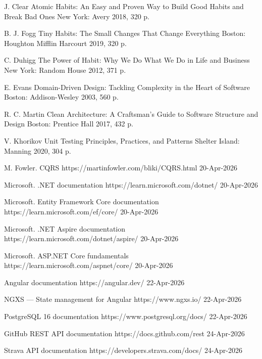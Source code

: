 

\bibitemieee
{J. Clear}
{Atomic Habits: An Easy and Proven Way to Build Good Habits and Break Bad Ones}
{New York: Avery}
{2018, 320 p.}

\bibitemieee
{B. J. Fogg}
{Tiny Habits: The Small Changes That Change Everything}
{Boston: Houghton Mifflin Harcourt}
{2019, 320 p.}

\bibitemieee
{C. Duhigg}
{The Power of Habit: Why We Do What We Do in Life and Business}
{New York: Random House}
{2012, 371 p.}

\bibitemieee
{E. Evans}
{Domain-Driven Design: Tackling Complexity in the Heart of Software}
{Boston: Addison-Wesley}
{2003, 560 p.}

\bibitemieee
{R. C. Martin}
{Clean Architecture: A Craftsman's Guide to Software Structure and Design}
{Boston: Prentice Hall}
{2017, 432 p.}

\bibitemieee
{V. Khorikov}
{Unit Testing Principles, Practices, and Patterns}
{Shelter Island: Manning}
{2020, 304 p.}

\bibitemweb
{M. Fowler. CQRS}
{https://martinfowler.com/bliki/CQRS.html}
{20-Apr-2026}

\bibitemweb
{Microsoft. .NET documentation}
{https://learn.microsoft.com/dotnet/}
{20-Apr-2026}

\bibitemweb
{Microsoft. Entity Framework Core documentation}
{https://learn.microsoft.com/ef/core/}
{20-Apr-2026}

\bibitemweb
{Microsoft. .NET Aspire documentation}
{https://learn.microsoft.com/dotnet/aspire/}
{20-Apr-2026}

\bibitemweb
{Microsoft. ASP.NET Core fundamentals}
{https://learn.microsoft.com/aspnet/core/}
{20-Apr-2026}

\bibitemweb
{Angular documentation}
{https://angular.dev/}
{22-Apr-2026}

\bibitemweb
{NGXS — State management for Angular}
{https://www.ngxs.io/}
{22-Apr-2026}

\bibitemweb
{PostgreSQL 16 documentation}
{https://www.postgresql.org/docs/}
{22-Apr-2026}

\bibitemweb
{GitHub REST API documentation}
{https://docs.github.com/rest}
{24-Apr-2026}

\bibitemweb
{Strava API documentation}
{https://developers.strava.com/docs/}
{24-Apr-2026}

\closeCustomBibliography

